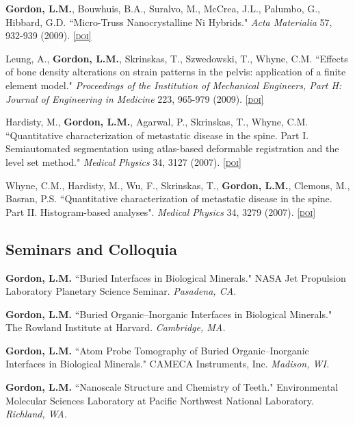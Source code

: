 \textbf{Gordon, L.M.}, Bouwhuis, B.A., Suralvo, M., McCrea, J.L., Palumbo, G., Hibbard, G.D. ``Micro-Truss Nanocrystalline Ni Hybrids." \emph{Acta Materialia} 57, 932-939 (2009). \href{http://dx.doi.org/10.1016/j.actamat.2008.10.038}{\textsc{\footnotesize{[doi]}}}

Leung, A., \textbf{Gordon, L.M.}, Skrinskas, T., Szwedowski, T., Whyne, C.M. ``Effects of bone density alterations on strain patterns in the pelvis: application of a finite element model." \emph{Proceedings of the Institution of Mechanical Engineers, Part H: Journal of Engineering in Medicine} 223, 965-979 (2009). \href{http://dx.doi.org/10.1243/09544119JEIM618}{\textsc{\footnotesize{[doi]}}}

Hardisty, M., \textbf{Gordon, L.M.}, Agarwal, P., Skrinskas, T., Whyne, C.M. ``Quantitative characterization of metastatic disease in the spine. Part I. Semiautomated segmentation using atlas-based deformable registration and the level set method." \emph{Medical Physics} 34, 3127 (2007). \href{http://dx.doi.org/10.1118/1.2746498}{\textsc{\footnotesize{[doi]}}}

Whyne, C.M., Hardisty, M., Wu, F., Skrinskas, T., \textbf{Gordon, L.M.}, Clemons, M., Basran, P.S. ``Quantitative characterization of metastatic disease in the spine. Part II. Histogram-based analyses". \emph{Medical Physics} 34, 3279 (2007). \href{http://dx.doi.org/10.1118/1.2756939}{\textsc{\footnotesize{[doi]}}}
\endgroup

\subsection*{Seminars and Colloquia}
\textbf{Gordon, L.M.} ``Buried Interfaces in Biological Minerals." NASA Jet Propulsion Laboratory Planetary Science Seminar. \emph{Pasadena, CA.}
\begingroup\setlength{\parskip}{0.15cm}

\textbf{Gordon, L.M.} ``Buried Organic--Inorganic Interfaces in Biological Minerals." The Rowland Institute at Harvard. \emph{Cambridge, MA.}

\textbf{Gordon, L.M.} ``Atom Probe Tomography of Buried Organic--Inorganic Interfaces in Biological Minerals." CAMECA Instruments, Inc. \emph{Madison, WI.}

\textbf{Gordon, L.M.} ``Nanoscale Structure and Chemistry of Teeth." Environmental Molecular Sciences Laboratory at Pacific Northwest National Laboratory. \emph{Richland, WA.}


